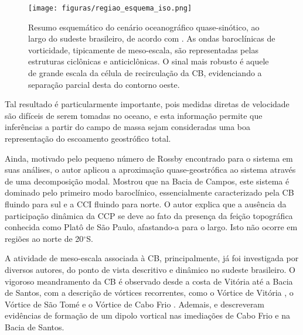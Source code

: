 \begin{figure}%
 \begin{center}
  \texttt{[image: figuras/regiao\_esquema\_iso.png]}
 \end{center}
 \vspace{-.5cm}
 \renewcommand{\baselinestretch}{1}
 \caption{\label{fig:subgiro} \small Resumo esquemático do cenário oceanográfico 
quase-sinótico, ao largo do sudeste brasileiro, de acordo com \cite{mattos2006}. 
As ondas baroclínicas de vorticidade, tipicamente de meso-escala, são representadas
 pelas estruturas ciclônicas e anticiclônicas. O sinal mais robusto é aquele de grande
escala da célula de recirculação da CB, evidenciando a separação parcial desta do contorno 
oeste.}
\end{figure}

Tal resultado é particularmente importante, pois medidas diretas de velocidade são
difíceis de serem tomadas no oceano, e esta informação permite que inferências
 a partir do campo de massa sejam consideradas uma boa representação do escoamento
geostrófico total. 

Ainda, motivado pelo pequeno número de Rossby encontrado para
o sistema em suas análises, o autor aplicou a aproximação quase-geostrófica ao 
sistema através de uma decomposição modal. Mostrou que na Bacia de Campos, este sistema
é dominado pelo primeiro modo baroclínico, essencialmente caracterizado pela
CB fluindo para sul e a CCI fluindo para norte. O autor explica que a ausência da participação dinâmica da
CCP se deve ao fato da presença  da feição topográfica
conhecida como Platô de São Paulo, afastando-a para o largo.
Isto não ocorre em regiões ao norte de 20$^\circ$S.

A atividade de meso-escala associada à  CB, principalmente, já foi investigada por diversos autores, do ponto 
de vista descritivo e dinâmico no sudeste brasileiro. O vigoroso meandramento da CB é observado desde
a costa de Vitória até a Bacia de Santos, com a descrição de vórtices recorrentes, 
como o Vórtice de Vitória \citep{schmid_etal1995}, o Vórtice de São Tomé \citep{calado_etal2006} 
e o Vórtice de Cabo Frio \citep{calado2006}.  Ademais, \cite{campos_etal1995} e 
\cite{pereira2005} descreveram evidências de formação de um dipolo vortical nas imediações de Cabo Frio
e na Bacia de Santos.

